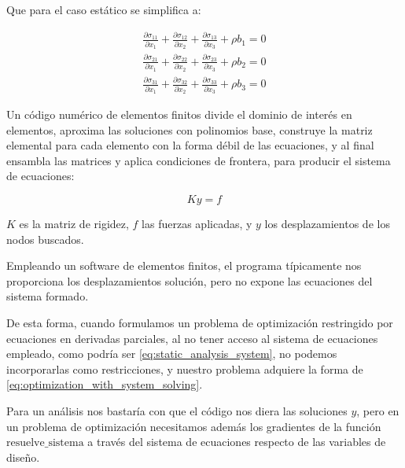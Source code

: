 Que para el caso estático se simplifica a:

\begin{align}
	\frac{\partial \sigma_{11}}{\partial x_1} + \frac{\partial \sigma_{12}}{\partial x_2} + \frac{\partial \sigma_{13}}{\partial x_3} + \rho b_1 = 0 \\
	\frac{\partial \sigma_{21}}{\partial x_1} + \frac{\partial \sigma_{22}}{\partial x_2} + \frac{\partial \sigma_{23}}{\partial x_3} + \rho b_2 = 0 \\
	\frac{\partial \sigma_{31}}{\partial x_1} + \frac{\partial \sigma_{32}}{\partial x_2} + \frac{\partial \sigma_{33}}{\partial x_3} + \rho b_3 = 0
\end{align}

Un código numérico de elementos finitos divide el dominio de interés en
elementos, aproxima las soluciones con polinomios base, construye la matriz
elemental para cada elemento con la forma débil de las ecuaciones, y al final
ensambla las matrices y aplica condiciones de frontera, para producir el
sistema de ecuaciones:

\begin{equation} \label{eq:static_analysis_system}
	K y = f
\end{equation}

$K$ es la matriz de rigidez, $f$ las fuerzas aplicadas, y $y$ los
desplazamientos de los nodos buscados.

Empleando un software de elementos finitos, el programa típicamente nos
proporciona los desplazamientos solución, pero no expone las ecuaciones del
sistema formado.

De esta forma, cuando formulamos un problema de optimización restringido por
ecuaciones en derivadas parciales, al no tener acceso al sistema de ecuaciones
empleado, como podría ser \eqref{eq:static_analysis_system}, no podemos
incorporarlas como restricciones, y nuestro problema adquiere la forma de
\eqref{eq:optimization_with_system_solving}.

Para un análisis nos bastaría con que el código nos diera las soluciones $y$,
pero en un problema de optimización necesitamos además los gradientes de la
función $\text{resuelve\_sistema}$ a través del sistema de ecuaciones respecto
de las variables de diseño.
